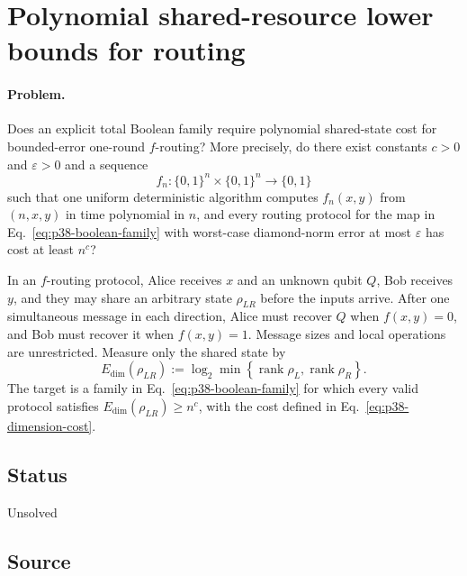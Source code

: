 \section{Polynomial shared-resource lower bounds for routing}
\label{sec:op_96cf7aa1c1be9be2}

\paragraph{Problem.}
Does an explicit total Boolean family require polynomial shared-state cost for
bounded-error one-round $f$-routing?  More precisely, do there exist constants
$c>0$ and $\varepsilon>0$ and a sequence
\begin{equation}
  f_n:\{0,1\}^n\times\{0,1\}^n\longrightarrow\{0,1\}
  \label{eq:p38-boolean-family}
\end{equation}
such that one uniform deterministic algorithm computes $f_n(x,y)$ from
$(n,x,y)$ in time polynomial in $n$, and every routing protocol for the map in
Eq.~\eqref{eq:p38-boolean-family} with worst-case diamond-norm error at most
$\varepsilon$ has cost at least $n^c$?

In an $f$-routing protocol, Alice receives $x$ and an unknown qubit $Q$, Bob
receives $y$, and they may share an arbitrary state $\rho_{LR}$ before the
inputs arrive.  After one simultaneous message in each direction, Alice must
recover $Q$ when $f(x,y)=0$, and Bob must recover it when $f(x,y)=1$.  Message
sizes and local operations are unrestricted.  Measure only the shared state
by
\begin{equation}
  E_{\mathrm{dim}}(\rho_{LR})
  :=\log_2\min\!\left\{
    \operatorname{rank}\rho_L,\operatorname{rank}\rho_R
  \right\}.
  \label{eq:p38-dimension-cost}
\end{equation}
The target is a family in Eq.~\eqref{eq:p38-boolean-family} for which every
valid protocol satisfies $E_{\mathrm{dim}}(\rho_{LR})\geq n^c$, with the cost
defined in Eq.~\eqref{eq:p38-dimension-cost}.

\subsection*{Status}

Unsolved

\subsection*{Source}

